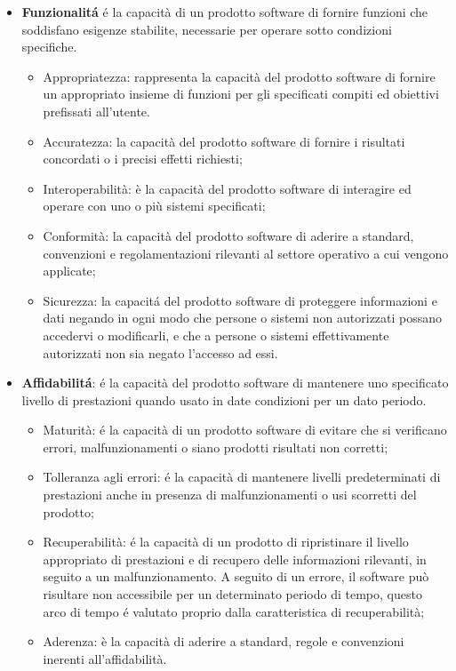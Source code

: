 \begin{itemize}
\item \textbf{Funzionalit\'a} \'e la capacità di un prodotto software di fornire funzioni che soddisfano esigenze stabilite, necessarie per operare sotto condizioni specifiche.
\begin{itemize}
\item Appropriatezza: rappresenta la capacità del prodotto software di fornire un appropriato insieme di funzioni per gli specificati compiti ed obiettivi prefissati all'utente.
\item Accuratezza: la capacità del prodotto software di fornire i risultati concordati o i precisi effetti richiesti;
\item Interoperabilità: è la capacità del prodotto software di interagire ed operare con uno o più sistemi specificati;
\item Conformità: la capacità del prodotto software di aderire a standard, convenzioni e regolamentazioni rilevanti al settore operativo a cui vengono applicate;
\item Sicurezza: la capacit\'a del prodotto software di proteggere informazioni e dati negando in ogni modo che persone o sistemi non autorizzati possano accedervi o modificarli, e che a persone o sistemi effettivamente autorizzati non sia negato l’accesso ad essi.
\end{itemize}
\item \textbf{Affidabilit\'a}: \'e la capacità del prodotto software di mantenere uno specificato livello di prestazioni quando usato in date condizioni per un dato periodo.
\begin{itemize}
\item Maturità: \'e la capacità di un prodotto software di evitare che si verificano errori, malfunzionamenti o siano prodotti risultati non corretti;
\item Tolleranza agli errori: \'e la capacità di mantenere livelli predeterminati di prestazioni anche in presenza di malfunzionamenti o usi scorretti del prodotto;
\item Recuperabilità: \'e la capacità di un prodotto di ripristinare il livello appropriato di prestazioni e di recupero delle informazioni rilevanti, in seguito a un malfunzionamento. A seguito di un errore, il software può risultare non accessibile per un determinato periodo di tempo, questo arco di tempo \'e valutato proprio dalla caratteristica di recuperabilità;
\item Aderenza: è la capacità di aderire a standard, regole e convenzioni inerenti all'affidabilità.

\end{itemize}
\end{itemize}
